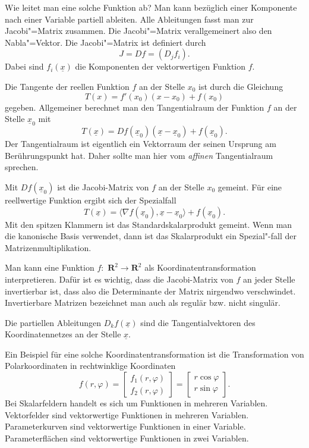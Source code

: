 \documentclass[a4paper,10pt,fleqn,twocolumn,twoside]{article}
\begin{document}
Wie leitet man eine solche Funktion ab? Man kann bezüglich einer
Komponente nach einer Variable partiell ableiten. Alle Ableitungen
fasst man zur Jacobi"=Matrix zusammen. Die Jacobi"=Matrix
verallgemeinert also den Nabla"=Vektor. Die Jacobi"=Matrix ist
definiert durch
\[J = Df = (D_j f_i).\]
\noindent
Dabei sind \(f_i(\underline x)\) die Komponenten der vektorwertigen
Funktion \(f\).

Die Tangente der reellen Funktion \(f\) an der Stelle \(x_0\)
ist durch die Gleichung
\[T(x) = f'(x_0)(x-x_0)+f(x_0)\]
%
gegeben. Allgemeiner berechnet man den Tangentialraum der Funktion \(f\)
an der Stelle \(\underline x_0\) mit
\[T(\underline x)
= Df(\underline x_0)(\underline x-\underline x_0)+f(\underline x_0).\]
%
Der Tangentialraum ist eigentlich ein Vektorraum der seinen Ursprung
am Berührungspunkt hat. Daher sollte man hier vom \textit{affinen}
Tangentialraum sprechen.

Mit \(Df(\underline x_0)\) ist die Jacobi-Matrix von \(f\) an der
Stelle \(x_0\) gemeint. Für eine reellwertige Funktion ergibt sich der
Spezialfall
\[T(\underline x) = \langle\nabla f(\underline x_0),\underline x
-\underline x_0\rangle+f(\underline x_0).\]
%
Mit den spitzen Klammern ist das Standardskalarprodukt gemeint.
Wenn man die kanonische Basis verwendet, dann ist das Skalarprodukt
ein Spezial"-fall der Matrizenmultiplikation.

Man kann eine Funktion \(f{:}\,\, \mathbf R^2\rightarrow \mathbf R^2\)
als Koordinatentransformation interpretieren. Dafür ist es wichtig,
dass die Jacobi-Matrix von \(f\) an jeder Stelle invertierbar ist,
dass also die Determinante der Matrix nirgendwo verschwindet.
Invertierbare Matrizen bezeichnet man auch als regulär bzw.
nicht singulär.

Die partiellen Ableitungen \(D_kf(\underline x)\) sind die
Tangentialvektoren des Koordinatennetzes an der Stelle
\(\underline x\).

Ein Beispiel für eine solche Koordinatentransformation ist die
Transformation von Polarkoordinaten in rechtwinklige Koordinaten
\[f(r,\varphi)
= \begin{bmatrix}
f_1(r,\varphi)\\
f_2(r,\varphi)
\end{bmatrix}
= \begin{bmatrix}
r\cos\varphi\\
r\sin\varphi
\end{bmatrix}.\]
\noindent
Bei Skalarfeldern handelt es sich um Funktionen in mehreren
Variablen. Vektorfelder sind vektorwertige Funktionen in mehreren
Variablen. Parameterkurven sind vektorwertige Funktionen in einer
Variable. Parameterflächen sind vektorwertige Funktionen in zwei
Variablen.
\end{document}
